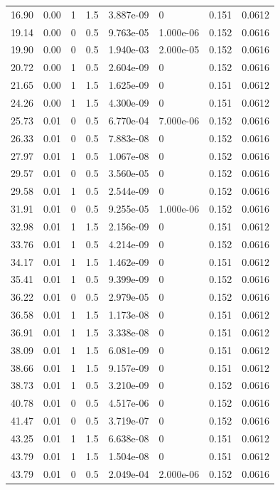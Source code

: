 \documentclass[preview]{standalone}
\begin{document}
{{\begin{tabular}{L{1.2cm}C{1.2cm} C{0.3cm}C{0.5cm} C{1.4cm}C{1.4cm} C{1.4cm}C{1.4cm}}
  16.90  &  0.00  & 1     & 1.5 &  3.887e-09  & 0  & 0.151 &  0.0612   \\ 
  19.14  &  0.00  & 0     & 0.5 &  9.763e-05  & 1.000e-06  & 0.152 &  0.0616   \\ 
  19.90  &  0.00  & 0     & 0.5 &  1.940e-03  & 2.000e-05  & 0.152 &  0.0616   \\ 
  20.72  &  0.00  & 1     & 0.5 &  2.604e-09  & 0  & 0.152 &  0.0616   \\ 
  21.65  &  0.00  & 1     & 1.5 &  1.625e-09  & 0  & 0.151 &  0.0612   \\ 
  24.26  &  0.00  & 1     & 1.5 &  4.300e-09  & 0  & 0.151 &  0.0612   \\ 
  25.73  &  0.01  & 0     & 0.5 &  6.770e-04  & 7.000e-06  & 0.152 &  0.0616   \\ 
  26.33  &  0.01  & 0     & 0.5 &  7.883e-08  & 0  & 0.152 &  0.0616   \\ 
  27.97  &  0.01  & 1     & 0.5 &  1.067e-08  & 0  & 0.152 &  0.0616   \\ 
  29.57  &  0.01  & 0     & 0.5 &  3.560e-05  & 0  & 0.152 &  0.0616   \\ 
  29.58  &  0.01  & 1     & 0.5 &  2.544e-09  & 0  & 0.152 &  0.0616   \\ 
  31.91  &  0.01  & 0     & 0.5 &  9.255e-05  & 1.000e-06  & 0.152 &  0.0616   \\ 
  32.98  &  0.01  & 1     & 1.5 &  2.156e-09  & 0  & 0.151 &  0.0612   \\ 
  33.76  &  0.01  & 1     & 0.5 &  4.214e-09  & 0  & 0.152 &  0.0616   \\ 
  34.17  &  0.01  & 1     & 1.5 &  1.462e-09  & 0  & 0.151 &  0.0612   \\ 
  35.41  &  0.01  & 1     & 0.5 &  9.399e-09  & 0  & 0.152 &  0.0616   \\ 
  36.22  &  0.01  & 0     & 0.5 &  2.979e-05  & 0  & 0.152 &  0.0616   \\ 
  36.58  &  0.01  & 1     & 1.5 &  1.173e-08  & 0  & 0.151 &  0.0612   \\ 
  36.91  &  0.01  & 1     & 1.5 &  3.338e-08  & 0  & 0.151 &  0.0612   \\ 
  38.09  &  0.01  & 1     & 1.5 &  6.081e-09  & 0  & 0.151 &  0.0612   \\ 
  38.66  &  0.01  & 1     & 1.5 &  9.157e-09  & 0  & 0.151 &  0.0612   \\ 
  38.73  &  0.01  & 1     & 0.5 &  3.210e-09  & 0  & 0.152 &  0.0616   \\ 
  40.78  &  0.01  & 0     & 0.5 &  4.517e-06  & 0  & 0.152 &  0.0616   \\ 
  41.47  &  0.01  & 0     & 0.5 &  3.719e-07  & 0  & 0.152 &  0.0616   \\ 
  43.25  &  0.01  & 1     & 1.5 &  6.638e-08  & 0  & 0.151 &  0.0612   \\ 
  43.79  &  0.01  & 1     & 1.5 &  1.504e-08  & 0  & 0.151 &  0.0612   \\ 
  43.79  &  0.01  & 0     & 0.5 &  2.049e-04  & 2.000e-06  & 0.152 &  0.0616   \\ 
\hline 
\end{tabular} 

}}
\end{document}
